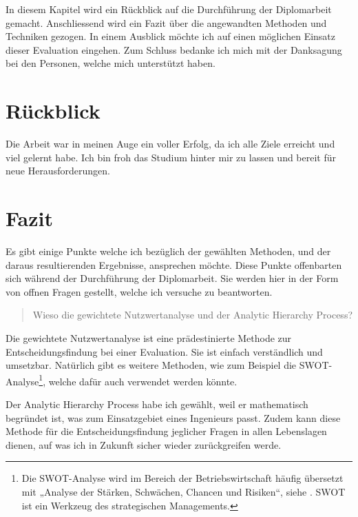 In diesem Kapitel wird ein Rückblick auf die Durchführung der Diplomarbeit
gemacht. Anschliessend wird ein Fazit über die angewandten Methoden und
Techniken gezogen. In einem Ausblick möchte ich auf einen möglichen Einsatz
dieser Evaluation eingehen. Zum Schluss bedanke ich mich mit der Danksagung bei
den Personen, welche mich unterstützt haben.

\section{Rückblick}

Die Arbeit war in meinen Auge ein voller Erfolg, da ich alle Ziele erreicht und
viel gelernt habe. Ich bin froh das Studium hinter mir zu lassen und bereit für
neue Herausforderungen.

\section{Fazit}

Es gibt einige Punkte welche ich bezüglich der gewählten Methoden, und der
daraus resultierenden Ergebnisse, ansprechen möchte. Diese Punkte
offenbarten sich während der Durchführung der Diplomarbeit. Sie werden hier
in der Form von offnen Fragen gestellt, welche ich versuche zu beantworten.
\newline

\begin{quote}\begin{itshape}Wieso die gewichtete Nutzwertanalyse und der
Analytic Hierarchy Process?\end{itshape}\end{quote}

Die gewichtete Nutzwertanalyse ist eine prädestinierte Methode zur
Entscheidungsfindung bei einer Evaluation. Sie ist einfach verständlich und
umsetzbar. Natürlich gibt es weitere Methoden, wie zum Beispiel die
SWOT-Analyse\footnote{Die SWOT-Analyse wird im Bereich der Betriebswirtschaft
häufig übersetzt mit „Analyse der Stärken, Schwächen, Chancen und
Risiken“, siehe \cite{SWOT}. SWOT ist ein Werkzeug des strategischen
Managements.}, welche dafür auch verwendet werden könnte.

Der Analytic Hierarchy Process habe ich gewählt, weil er mathematisch begründet
ist, was zum Einsatzgebiet eines Ingenieurs passt. Zudem kann diese Methode für
die Entscheidungsfindung jeglicher Fragen in allen Lebenslagen dienen, auf
was ich in Zukunft sicher wieder zurückgreifen werde.
\newline

